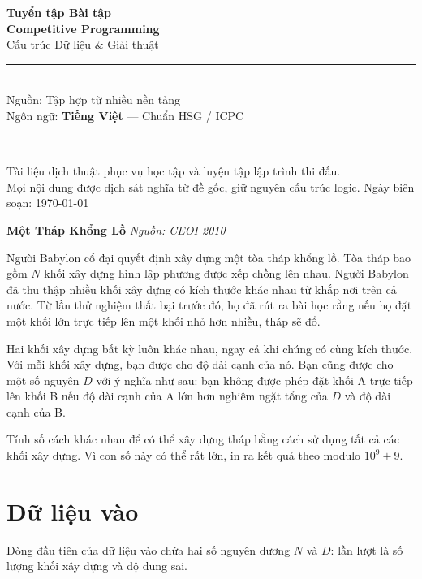 \documentclass[12pt,a4paper]{article}
\newcommand{\problem}[2]{%
  \addcontentsline{toc}{section}{#1}%
  \begin{mdframed}[
    linecolor=framecolor,
    linewidth=1.5pt,
    backgroundcolor=white,
    topline=true, bottomline=true,
    leftline=true, rightline=true,
    innerleftmargin=10pt, innerrightmargin=10pt,
    innertopmargin=6pt, innerbottommargin=6pt,
  ]
  \textbf{\large #1} \hfill \textit{Nguồn: #2}
  \end{mdframed}
  \vspace{4pt}%
}
\begin{document}

\begin{titlepage}
  \centering
  \vspace*{3cm}
  {\Huge\bfseries\color{sectioncolor} Tuyển tập Bài tập\\[0.4em]
   Competitive Programming}\\[0.8em]
  {\large\color{gray} Cấu trúc Dữ liệu \& Giải thuật}\\[2em]
  \rule{\linewidth}{1pt}\\[1.5em]
  {\large Nguồn: Tập hợp từ nhiều nền tảng}\\[0.5em]
  {\large Ngôn ngữ: \textbf{Tiếng Việt} — Chuẩn HSG / ICPC}\\[2em]
  \rule{\linewidth}{1pt}\\[3em]
  {\normalsize\color{gray}
    Tài liệu dịch thuật phục vụ học tập và luyện tập lập trình thi đấu.\\
    Mọi nội dung được dịch sát nghĩa từ đề gốc, giữ nguyên cấu trúc logic.
  }
  \vfill
  {\small\color{gray} Ngày biên soạn: \today}
\end{titlepage}

\tableofcontents
\newpage

\problem{Một Tháp Khổng Lồ}{CEOI 2010}

Người Babylon cổ đại quyết định xây dựng một tòa tháp khổng lồ. Tòa tháp bao gồm $N$ khối xây dựng hình lập phương được xếp chồng lên nhau. Người Babylon đã thu thập nhiều khối xây dựng có kích thước khác nhau từ khắp nơi trên cả nước. Từ lần thử nghiệm thất bại trước đó, họ đã rút ra bài học rằng nếu họ đặt một khối lớn trực tiếp lên một khối nhỏ hơn nhiều, tháp sẽ đổ.

Hai khối xây dựng bất kỳ luôn khác nhau, ngay cả khi chúng có cùng kích thước. Với mỗi khối xây dựng, bạn được cho độ dài cạnh của nó. Bạn cũng được cho một số nguyên $D$ với ý nghĩa như sau: bạn không được phép đặt khối A trực tiếp lên khối B nếu độ dài cạnh của A lớn hơn nghiêm ngặt tổng của $D$ và độ dài cạnh của B.

Tính số cách khác nhau để có thể xây dựng tháp bằng cách sử dụng tất cả các khối xây dựng. Vì con số này có thể rất lớn, in ra kết quả theo modulo $10^9 + 9$.

\section*{Dữ liệu vào}
Dòng đầu tiên của dữ liệu vào chứa hai số nguyên dương $N$ và $D$: lần lượt là số lượng khối xây dựng và độ dung sai.
\end{document}
